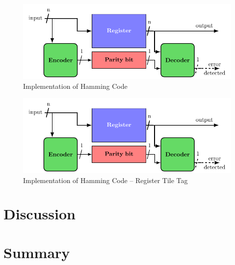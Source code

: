 \begin{figure}[ht]
    \centering
    \includegraphics[page=2, width=\textwidth]{c5_countermeasures_dift/img/archi_contremesures.pdf}
    \caption{Implementation of Hamming Code}
    \label{fig:implementation_hc_1}
\end{figure}

\begin{figure}[ht]
    \centering
    \includegraphics[page=3, width=\textwidth]{c5_countermeasures_dift/img/archi_contremesures.pdf}
    \caption{Implementation of Hamming Code -- Register Tile Tag}
    \label{fig:implementation_hc_2}
\end{figure}

\section{Discussion}

\section{Summary}

